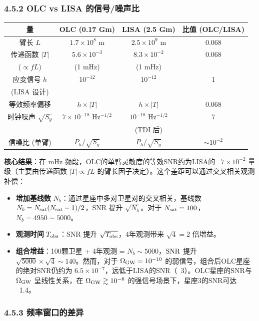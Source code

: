 \documentclass[12pt,a4paper]{article}
\begin{document}
\subsubsection{4.5.2 OLC vs LISA 的信号/噪声比}


\begin{tabular}{|c|c|c|c|}
\hline
量 & OLC (0.17 Gm) & LISA (2.5 Gm) & 比值 (OLC/LISA) \\
\hline
臂长 $L$ & $1.7 \times 10^8$ m & $2.5 \times 10^9$ m & 0.068 \\
传递函数 $|T|$ & $5.6 \times 10^{-3}$ & $8.3 \times 10^{-2}$ & 0.068 \\
  ($\propto fL$) & (1 mHz) & (1 mHz) & \\
应变信号 $h$ & $10^{-12}$ & $10^{-12}$ & 1 \\
  (LISA 设计) & & & \\
等效频率偏移 & $h \times |T|$ & $h \times |T|$ & 0.068 \\
时钟噪声 $\sqrt{S_y}$ & $7 \times 10^{-18}$ Hz$^{-1/2}$ & $10^{-18}$ Hz$^{-1/2}$ & 7 \\
  & & (TDI 后) & \\
信噪比 (单臂) & $P_h/\sqrt{S_y}$ & $P_h/\sqrt{S_y}$ & $\sim 10^{-2}$ \\
\hline
\end{tabular}


\textbf{核心结果}：在 mHz 频段，OLC的单臂灵敏度的等效SNR约为LISA的 ~$7\times 10^{-2}$ 量级（主要由传递函数 $|T| \propto fL$ 的臂长因子决定）。这个差距可以通过交叉相关观测补偿：
\begin{itemize}
  \item[1] \textbf{增加基线数} $N_b$：通过星座中多对卫星对的交叉相关，基线数 $N_b = N_{\rm sat}(N_{\rm sat}-1)/2$，SNR 提升 $\sqrt{N_b}$。对于 $N_{\rm sat} = 100$，$N_b = 4950 \sim 5000$。
  \item[2] \textbf{观测时间} $T_{\rm obs}$：SNR 提升 $\sqrt{T_{\rm obs}}$，4年观测带来 $\sqrt{4} = 2$ 倍增益。
  \item[3] \textbf{组合增益}：100颗卫星 + 4年观测 = $N_b \sim 5000$，${\rm SNR}$ 提升 $\sqrt{5000} \times \sqrt{4} \sim 140$。然而，对于 $\Omega_{\rm GW} = 10^{-10}$ 的弱信号，组合后OLC星座的绝对SNR仍约为 $6.5\times 10^{-7}$，远低于LISA的SNR（~3）。OLC星座的SNR与 $\Omega_{\rm GW}$ 呈线性关系，在 $\Omega_{\rm GW} \gtrsim 10^{-6}$ 的强信号场景下，星座3的SNR可达 ~1.4。

\end{itemize}
\subsubsection{4.5.3 频率窗口的差异}
\end{document}
